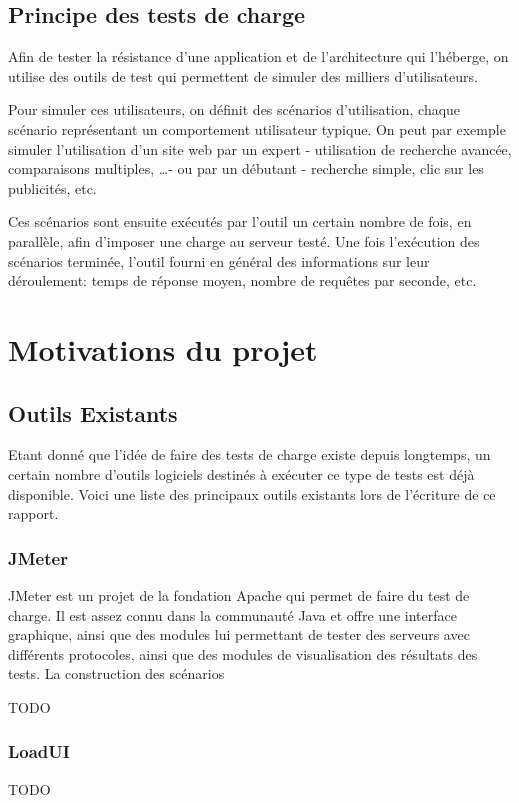 \subsection{Principe des tests de charge}
Afin de tester la résistance d'une application et de l'architecture qui l'héberge, on utilise des outils de test qui permettent de simuler des milliers d'utilisateurs.

Pour simuler ces utilisateurs, on définit des scénarios d'utilisation, chaque scénario représentant un comportement utilisateur typique. On peut par exemple simuler l'utilisation d'un site web par un expert - utilisation de recherche avancée, comparaisons multiples, \ldots - ou par un débutant - recherche simple, clic sur les publicités, etc.

Ces scénarios sont ensuite exécutés par l'outil un certain nombre de fois, en parallèle, afin d'imposer une charge au serveur testé. Une fois l'exécution des scénarios terminée, l'outil fourni en général des informations sur leur déroulement: temps de réponse moyen, nombre de requêtes par seconde, etc.

\section{Motivations du projet}
\subsection{Outils Existants}
Etant donné que l'idée de faire des tests de charge existe depuis longtemps, un certain nombre d'outils logiciels destinés à exécuter ce type de tests est déjà disponible. Voici une liste des principaux outils existants lors de l'écriture de ce rapport.

\subsubsection{JMeter} 
JMeter est un projet de la fondation Apache qui permet de faire du test de charge. Il est assez connu dans la communauté Java et offre une interface graphique, ainsi que des modules lui permettant de tester des serveurs avec différents protocoles, ainsi que des modules de visualisation des résultats des tests. La construction des scénarios 

TODO

\subsubsection{LoadUI}
TODO

